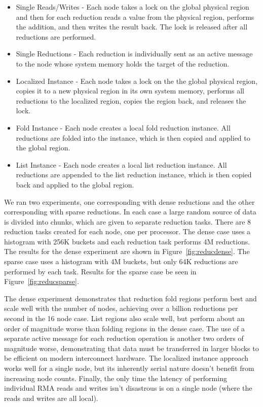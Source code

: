 \begin{itemize} \itemsep1pt \parskip0pt 
\item Single Reads/Writes - Each node takes a lock on the global physical region and then for each reduction
reads a value from the physical region, performs the addition, and then writes the result back.  
The lock is released after all reductions are performed.
\item Single Reductions - Each reduction is individually sent as an active message to the node whose
system memory holds the target of the reduction.
\item Localized Instance - Each node takes a lock on the the global physical region, copies it to a new physical
region in its own system memory, performs all reductions to the localized region, copies the region back, and releases the lock.
\item Fold Instance - Each node creates a local fold reduction instance.
All reductions are folded into the instance, which is then copied and applied to the global region.
\item List Instance - Each node creates a local list reduction instance.
All reductions are appended to the list reduction instance, which is then copied back and applied to the global region.
\end{itemize}

We ran two experiments, one corresponding with dense reductions and the other corresponding with sparse
reductions.  In each case a large random source of data is divided into chunks, which are given to
separate reduction tasks.  There are 8 reduction tasks created for each node, one per processor.  The dense
case uses a histogram with 256K buckets and each reduction task performs 4M reductions.  The results for the
dense experiment are shown in Figure~\ref{fig:reducdense}.  The sparse case uses a histogram with 4M buckets,
but only 64K reductions are performed by each task.  Results for the sparse case
be seen in Figure~\ref{fig:reducsparse}.

The dense experiment demonstrates that reduction fold regions perform 
best and scale well with the number of nodes, achieving over a billion reductions
per second in the 16 node case.  List regions also scale well, but perform about an
order of magnitude worse than folding regions in the dense case.  The use of a separate active message for
each reduction operation is another two orders of magnitude worse, demonstrating that data must be
transferred in larger blocks to be efficient on modern interconnect hardware.  The localized instance approach
works well for a single node, but its inherently serial nature doesn't benefit from increasing node counts.  Finally, the only time the latency of performing individual RMA reads and writes isn't disastrous is
on a single node (where the reads and writes are all local).

